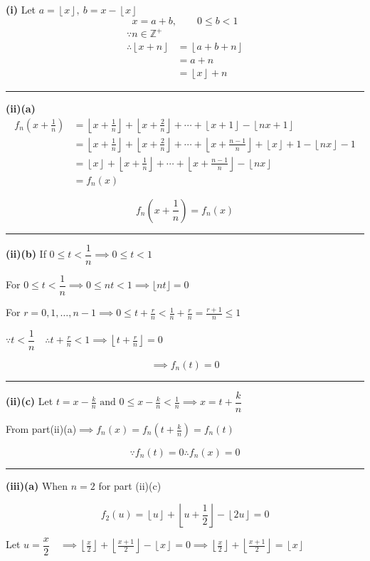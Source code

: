 \documentclass[12pt]{article}
\begin{document}
\newcommand{\ds}{\displaystyle}
\newcommand{\fl}[1]{\left\lfloor #1\right\rfloor}

\textbf{(i)} Let $\ds a=\fl{x},\  b=x-\fl{x}$
$$x=a+b,\qquad 0\leq b<1$$
\begin{align*}
\because n\in \mathbb{Z^+}\\
\therefore\fl{x+n}
&=\fl{a+b+n}\\
&=a+n\\
&=\fl{x}+n
\end{align*}
\bigskip\hrule\bigskip

\textbf{(ii)(a)}
\begin{align*}
f_n\left(x+\frac1n\right)
&=\fl{x+\frac1n}+\fl{x+\frac2n}+\cdots+\fl{x+1}-\fl{nx+1}\\
&=\fl{x+\frac1n}+\fl{x+\frac2n}+\cdots+\fl{x+\frac{n-1}{n}}
+\fl{x}+1-\fl{nx}-1\\
&=\fl{x}+\fl{x+\frac1n}+\cdots+\fl{x+\frac{n-1}{n}}-\fl{nx}\\
&=f_n(x)
\end{align*}

$$\boxed{f_n\left(x+\frac1n\right)=f_n(x)}$$

\bigskip\hrule\bigskip

\textbf{(ii)(b)} If  $0\leq t<\dfrac{1}{n}\implies 0\leq t<1$

For $0\leq t<\dfrac1n\implies 0\leq nt<1\implies\lfloor nt\rfloor=0$

For $\ds r=0,1,\dots,n-1 \implies  0\leq t+\frac rn<\frac1n+\frac rn=\frac{r+1}{n}\leq1$

$\ds\because t<\dfrac1n\quad \therefore  t+\frac rn<1 \implies \left\lfloor t+\frac rn\right\rfloor=0$

$$\implies \boxed{f_n(t)=0}$$

\bigskip\hrule\bigskip



\textbf{(ii)(c)} Let $\ds t=x-\frac{k}{n} \text{ and } 0\leq x-\frac{k}{n}<\frac1n\implies x=t+\dfrac{k}{n}$

From part(ii)(a)$\ds \implies f_n(x)=f_n\left(t+\frac{k}{n}\right)=f_n(t)$

$$\because f_n(t)=0 \therefore \boxed{f_n(x)=0}$$

\bigskip\hrule\bigskip

\textbf{(iii)(a)} When $n=2$ for part (ii)(c)

$$f_2(u)=\fl{u}+\fl{u+\frac12}-\fl{2u}=0$$

Let $\ds u=\dfrac{x}{2} \quad \implies \fl{\frac{x}{2}}+\fl{\frac{x+1}{2}}-\fl{x}=0 \implies \boxed{\fl{\frac{x}{2}}+\fl{\frac{x+1}{2}}=\fl{x}}$
\end{document}
